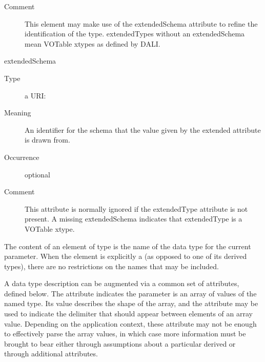 \documentclass[11pt,a4paper]{ivoa}
\begin{document}
\begin{generated}
\begin{bigdescription}
\begin{description}
\item[Comment] 
                     This element may make use of the extendedSchema
                     attribute to refine the identification of the 
                     type.  extendedTypes without an extendedSchema 
                     mean VOTable xtypes as defined by DALI.
                  
\end{description}
\item[extendedSchema]
\begin{description}
\item[Type] a URI: 
\item[Meaning] 
                     An identifier for the schema that the value given
                     by the extended attribute is drawn from.
                  
\item[Occurrence] optional
\item[Comment] 
                     This attribute is normally ignored if the
                     extendedType attribute is not present.  A missing
                     extendedSchema indicates that extendedType is a
                     VOTable xtype.
                  
\end{description}


\end{bigdescription}\endgroup

\endgroup
\end{generated}


The content of an element of type  is the name
of the data type for the current parameter.  When the element is explicitly
a  (as opposed to one of its derived types),
there are no restrictions on the names that may be included.  



A data type description can be augmented via a common set of
 attributes, defined below.  The
 attribute indicates the parameter is an array
of values of the named type.  Its value describes the shape of the
array, and the  attribute may be used to indicate
the delimiter that should appear between elements of an array value.
Depending on the application context, these attribute may not be
enough to effectively parse the array values, in which case more
information must be brought to bear either through assumptions about
a particular derived  or through additional
attributes.  
\end{document}

